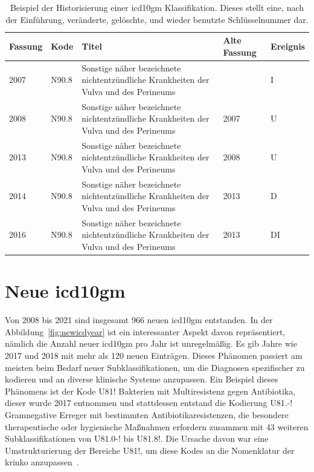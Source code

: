 \begin{table}[ht]
	\centering
	\small
	\caption[Beispiel der Historisierung einer \acs{icd10gm} Klassifikation]{Beispiel der Historisierung einer \acs{icd10gm} Klassifikation. Dieses stellt eine, nach der Einführung, veränderte, gelöschte, und wieder benutzte Schlüsselnummer dar.}
	\label{tab:IUDDI}
	\begin{tabular}{|l|l|p{6cm}|l|l|}
		\hline
		\rowcolor{lightgray} Fassung & Kode & Titel & Alte Fassung & Ereignis \\ \hline
		2007 & N90.8  & Sonstige näher bezeichnete nichtentzündliche Krankheiten der Vulva und des Perineums &  & I \\ \hline
		2008 & N90.8  & Sonstige näher bezeichnete nichtentzündliche Krankheiten der Vulva und des Perineums & 2007 & U \\ \hline
		2013 & N90.8  & Sonstige näher bezeichnete nichtentzündliche Krankheiten der Vulva und des Perineums & 2008 & U \\ \hline
		2014 & N90.8  & Sonstige näher bezeichnete nichtentzündliche Krankheiten der Vulva und des Perineums & 2013 & D \\ \hline
		2016 & N90.8  & Sonstige näher bezeichnete nichtentzündliche Krankheiten der Vulva und des Perineums & 2013 & DI \\ \hline
	\end{tabular}
\end{table}

\section{Neue \acs{icd10gm}} \label{sec:newicd}

Von 2008 bis 2021 sind insgesamt 966 neuen \ac{icd10gm} entstanden. In der Abbildung~\ref{fig:newicdyear} ist ein interessanter Aspekt davon repräsentiert, nämlich die Anzahl neuer \ac{icd10gm} pro Jahr ist unregelmäßig. Es gib Jahre wie 2017 und 2018 mit mehr als 120 neuen Einträgen. Dieses Phänomen passiert am meisten beim Bedarf neuer Subklassifikationen, um die Diagnosen spezifischer zu kodieren und an diverse klinische Systeme anzupassen. Ein Beispiel dieses Phänomens ist der Kode \textsf{U81!} \textsf{Bakterien mit Multiresistenz gegen Antibiotika}, dieser wurde 2017 entnommen und stattdessen entstand die Kodierung \textsf{U81.-!} \textsf{Gramnegative Erreger mit bestimmten Antibiotikaresistenzen, die besondere therapeutische oder hygienische Maßnahmen erfordern} zusammen mit 43 weiteren Subklassifikationen von \textsf{U81.0-!} bis \textsf{U81.8!}. Die Ursache davon war eine Umstrukturierung der Bereiche \textsf{U81!}, um diese Kodes an die Nomenklatur der \ac{krinko} anzupassen~\cite{erreg17}.

